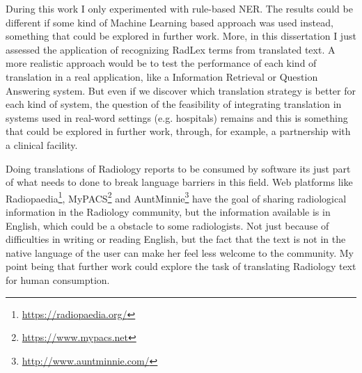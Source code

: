 During this work I only experimented with rule-based NER. The results could be different if some kind of Machine Learning based approach was used instead, something that could be explored in further work. More, in this dissertation I just assessed the application of recognizing RadLex terms from translated text. A more realistic approach would be to test the performance of each kind of translation in a real application, like a Information Retrieval \citep{Manning2009b} or Question Answering system. But even if we discover which translation strategy is better for each kind of system, the question of the feasibility of integrating translation in systems used in real-word settings (e.g. hospitals) remains and this is something that could be explored in further work, through, for example, a partnership with a clinical facility.

Doing translations of Radiology reports to be consumed by software its just part of what needs to done to break language barriers in this field. Web platforms like Radiopaedia\footnote{\url{https://radiopaedia.org/}}, MyPACS\footnote{\url{https://www.mypacs.net}} and AuntMinnie\footnote{\url{http://www.auntminnie.com/}} have the goal of sharing radiological information in the Radiology community, but the information available is in English, which could be a obstacle to some radiologists. Not just because of difficulties in writing or reading English, but the fact that the text is not in the native language of the user can make her feel less welcome to the community. My point being that further work could explore the task of translating Radiology text for human consumption.